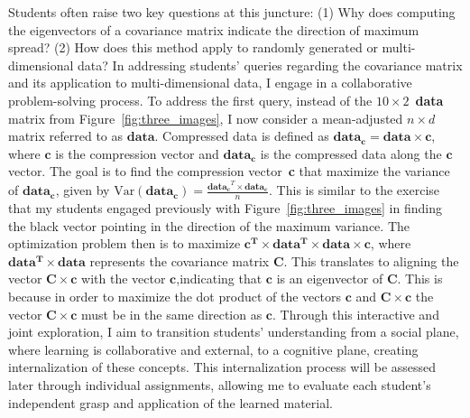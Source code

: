 \documentclass{article}
\begin{document}
Students often raise two key questions at this juncture: 
(1) Why does computing the eigenvectors of a covariance matrix indicate the direction of maximum spread?
(2) How does this method apply to randomly generated or multi-dimensional data?
In addressing students' queries regarding the covariance matrix and its application to multi-dimensional data, I engage in a collaborative problem-solving process. 
To address the first query,
instead of the $10 \times 2$~\textbf{data} matrix from Figure~\ref{fig:three_images}, I now consider 
a mean-adjusted \(n \times d\) matrix referred to as \(\mathbf{data}\). 
Compressed data is defined as \(\mathbf{data_{c}} = \mathbf{data} \times \mathbf{c}\), where \(\mathbf{c}\) is the compression vector and \(\mathbf{data_{c}}\) is the compressed data along the $\mathbf{c}$ vector. 
The goal is to find the compression vector~\textbf{c} that maximize the variance of \(\mathbf{data_{c}}\), given by $\text{Var}(\mathbf{data_{c}}) = \frac{\mathbf{data_{c}}^T \times \mathbf{data_{c}}}{n}$. 
This is similar to the exercise that my students engaged previously with Figure~\ref{fig:three_images} in finding the black vector pointing in the direction of the maximum variance. 
The optimization problem then is to maximize $\mathbf{c^T \times data^T \times data \times c}$, where $\mathbf{data^T \times data}$ represents the covariance matrix \(\mathbf{C}\). 
This translates to aligning the vector \(\mathbf{C \times c}\) with the vector \(\mathbf{c}\),indicating that \(\mathbf{c}\) is an eigenvector of \(\mathbf{C}\).
This is because in order to maximize the dot product of the vectors $\mathbf{c}$ and $\mathbf{C}\times \mathbf{c}$ the vector $\mathbf{C}\times \mathbf{c}$ must be in the same direction as $\mathbf{c}$.
Through this interactive and joint exploration, I aim to transition students' understanding from a social plane, where learning is collaborative and external, to a cognitive plane, creating internalization of these concepts. 
This internalization process will be assessed later through individual assignments, allowing me to evaluate each student's independent grasp and application of the learned material.
\end{document}
